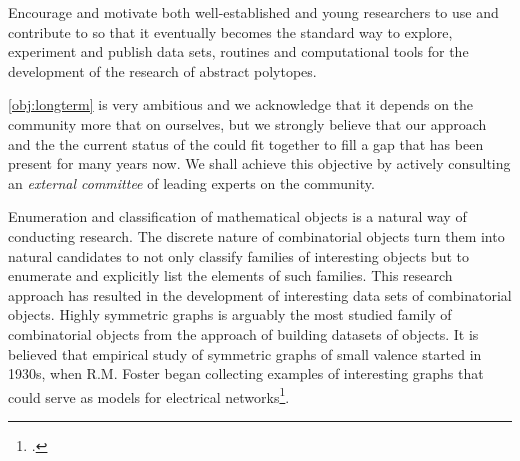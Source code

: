 \begin{obj}\label{obj:longterm}
Encourage and motivate both well-established and young researchers to use and contribute to \ourp  so that it eventually becomes the standard way to explore, experiment and publish data sets, routines and computational tools for the development of the research of abstract polytopes.
\end{obj}

 \cref{obj:longterm} is very ambitious and we acknowledge that it depends on the community more that on ourselves, but we strongly believe that our approach and the the current status of the could fit together to fill a gap that has been present for many years now.
 We shall achieve this objective by actively consulting an \emph{external committee} of leading experts on the community.





Enumeration and classification of mathematical objects is a natural way of conducting research.
The discrete nature of combinatorial objects turn them into natural candidates to not only classify families of interesting objects but to enumerate and explicitly list the elements of such families.
This research approach has resulted in the development of interesting data sets of combinatorial objects.
Highly symmetric graphs is arguably the most studied family of combinatorial objects from the approach of building datasets of objects.
It is believed that empirical study of symmetric graphs of small valence started in 1930s, when R.M. Foster began collecting examples of interesting graphs that could serve as models for electrical networks\footcite{Foster_1932_GeometricalCircuitsElectrical}.

